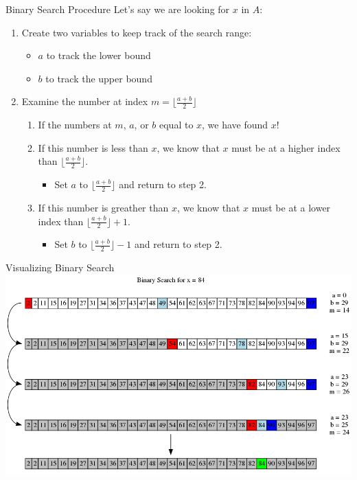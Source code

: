 \documentclass[11pt]{beamer}
\begin{document}
\begin{frame}{Binary Search Procedure}
Let's say we are looking for $x$ in $A$:
\begin{enumerate}
\item Create two variables to keep track of the search range:
\begin{itemize}
\item $a$ to track the lower bound
\item $b$ to track the upper bound
\end{itemize}
\item Examine the number at index $m = \lfloor \frac{a+b}{2} \rfloor$
\begin{enumerate}
\item If the numbers at $m$, $a$, or $b$ equal to $x$, we have found $x$! 
\item If this number is less than $x$, we know that $x$ must be at a higher index than  $\lfloor \frac{a+b}{2} \rfloor$.
\begin{itemize}
\item Set $a$ to $\lfloor \frac{a+b}{2} \rfloor$ and return to step 2.
\end{itemize}
\item If this number is greather than $x$, we know that $x$ must be at a lower index than  $\lfloor \frac{a+b}{2} \rfloor + 1$.
\begin{itemize}
\item Set $b$ to $\lfloor \frac{a+b}{2} \rfloor - 1$ and return to step 2.
\end{itemize}
\end{enumerate}
\end{enumerate}
\end{frame}

\begin{frame}{Visualizing Binary Search}
\center
\includegraphics[scale=0.3]{graphs/binSearch.png}
\end{frame}
\end{document}
